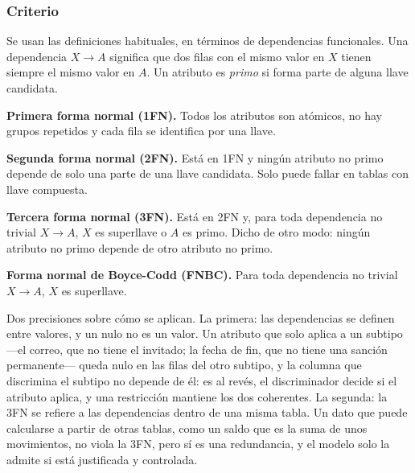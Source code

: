 \subsubsection*{Criterio}

Se usan las definiciones habituales, en términos de dependencias funcionales. Una dependencia $X \rightarrow A$ significa que dos filas con el mismo valor en $X$ tienen siempre el mismo valor en $A$. Un atributo es \emph{primo} si forma parte de alguna llave candidata.

\begin{reglas}
  \item \textbf{Primera forma normal (1FN).} Todos los atributos son atómicos, no hay grupos repetidos y cada fila se identifica por una llave.
  \item \textbf{Segunda forma normal (2FN).} Está en 1FN y ningún atributo no primo depende de solo una parte de una llave candidata. Solo puede fallar en tablas con llave compuesta.
  \item \textbf{Tercera forma normal (3FN).} Está en 2FN y, para toda dependencia no trivial $X \rightarrow A$, $X$ es superllave o $A$ es primo. Dicho de otro modo: ningún atributo no primo depende de otro atributo no primo.
  \item \textbf{Forma normal de Boyce-Codd (FNBC).} Para toda dependencia no trivial $X \rightarrow A$, $X$ es superllave.
\end{reglas}

Dos precisiones sobre cómo se aplican. La primera: las dependencias se definen entre valores, y un nulo no es un valor. Un atributo que solo aplica a un subtipo —el correo, que no tiene el invitado; la fecha de fin, que no tiene una sanción permanente— queda nulo en las filas del otro subtipo, y la columna que discrimina el subtipo no depende de él: es al revés, el discriminador decide si el atributo aplica, y una restricción  mantiene los dos coherentes. La segunda: la 3FN se refiere a las dependencias dentro de una misma tabla. Un dato que puede calcularse a partir de otras tablas, como un saldo que es la suma de unos movimientos, no viola la 3FN, pero sí es una redundancia, y el modelo solo la admite si está justificada y controlada.
